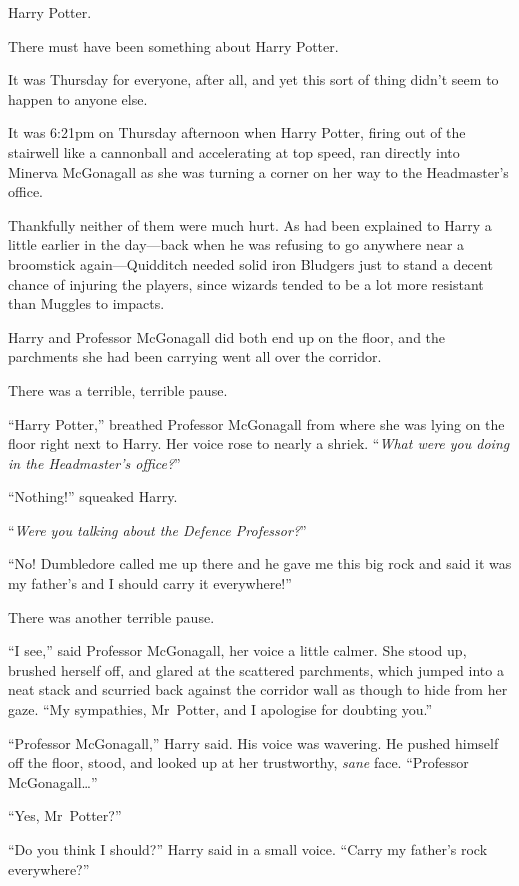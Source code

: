 \later

Harry Potter.

There must have been something about Harry Potter.

It was Thursday for everyone, after all, and yet this sort of thing didn’t seem to happen to anyone else.

It was 6:21pm on Thursday afternoon when Harry Potter, firing out of the stairwell like a cannonball and accelerating at top speed, ran directly into Minerva McGonagall as she was turning a corner on her way to the Headmaster’s office.

Thankfully neither of them were much hurt. As had been explained to Harry a little earlier in the day—back when he was refusing to go anywhere near a broomstick again—Quidditch needed solid iron Bludgers just to stand a decent chance of injuring the players, since wizards tended to be a lot more resistant than Muggles to impacts.

Harry and Professor McGonagall did both end up on the floor, and the parchments she had been carrying went all over the corridor.

There was a terrible, terrible pause.

“Harry Potter,” breathed Professor McGonagall from where she was lying on the floor right next to Harry. Her voice rose to nearly a shriek. “\emph{What were you doing in the Headmaster’s office?}”

“Nothing!” squeaked Harry.

“\emph{Were you talking about the Defence Professor?}”

“No! Dumbledore called me up there and he gave me this big rock and said it was my father’s and I should carry it everywhere!”

There was another terrible pause.

“I see,” said Professor McGonagall, her voice a little calmer. She stood up, brushed herself off, and glared at the scattered parchments, which jumped into a neat stack and scurried back against the corridor wall as though to hide from her gaze. “My sympathies, Mr~Potter, and I apologise for doubting you.”

“Professor McGonagall,” Harry said. His voice was wavering. He pushed himself off the floor, stood, and looked up at her trustworthy, \emph{sane} face. “Professor McGonagall…”

“Yes, Mr~Potter?”

“Do you think I should?” Harry said in a small voice. “Carry my father’s rock everywhere?”

